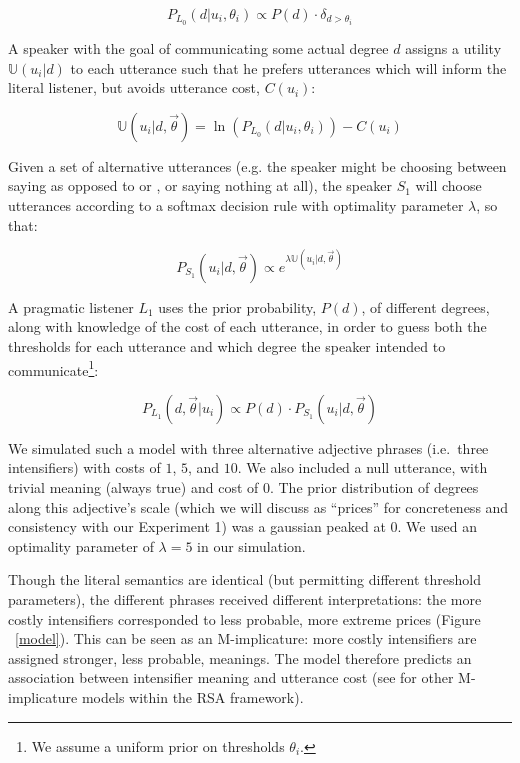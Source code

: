 \begin{appendices}
$$P_{L_0}(d|u_i, \theta_i) \propto P(d) \cdot \delta_{d > \theta_i}$$

A speaker with the goal of communicating some actual degree $d$ assigns a utility $\mathbb{U}(u_i|d)$ to each utterance such that he prefers utterances which will inform the literal listener, but avoids utterance cost, $C(u_i)$:

$$\mathbb{U}(u_i | d, \vec{\theta}) =  \ln\left(P_{L_0}(d | u_i, \theta_i) \right) - C(u_i) $$

Given a set of alternative utterances (e.g. the speaker might be choosing between saying  as opposed to  or , or saying nothing at all), the speaker $S_1$ will choose utterances according to a softmax decision rule \cite{sutton_reinforcement_2011} with optimality parameter $\lambda$, so that:

$$ P_{S_1}(u_i | d, \vec{\theta}) \propto e^{\lambda \mathbb{U}(u_i | d, \vec{\theta})} $$

A pragmatic listener $L_1$ uses the prior probability, $P(d)$, of different degrees, along with knowledge of the cost of each utterance, in order to guess both the thresholds for each utterance and which degree the speaker intended to communicate\footnote{We assume a uniform prior on thresholds $\theta_i$.}:

$$ P_{L_1}(d, \vec{\theta} | u_i) \propto P(d) \cdot P_{S_1}(u_i | d, \vec{\theta}) $$

We simulated such a model with three alternative adjective phrases (i.e.~three intensifiers) with costs of $1$, $5$, and $10$. We also included a null utterance, with trivial meaning (always true) and cost of $0$. The prior distribution of degrees along this adjective's scale (which we will discuss as ``prices'' for concreteness and consistency with our Experiment 1) was a gaussian peaked at $0$.
We used an optimality parameter of $\lambda=5$ in our simulation. 

Though the literal semantics are identical (but permitting different threshold parameters), the different phrases received different interpretations: the more costly intensifiers corresponded to less probable, more extreme prices (Figure ~\ref{model}).
This can be seen as an M-implicature: more costly intensifiers are assigned stronger, less probable, meanings. 
The model therefore predicts an association between intensifier meaning and utterance cost (see  for other M-implicature models within the RSA framework).



\end{appendices}

